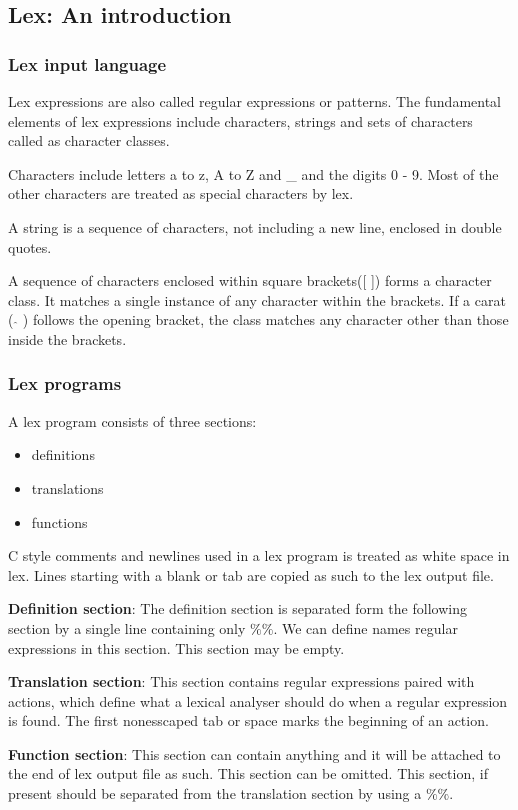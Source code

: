 \documentclass[a4paper, 12pt]{report}
\begin{document}
\subsection{Lex: An introduction}
\subsubsection{Lex input language}
Lex expressions are also called regular expressions or patterns. The fundamental 
elements of lex expressions include characters, strings and sets of characters
called as character classes.

Characters include letters a to z, A to Z and \_ and the digits 0 - 9. Most of 
the other characters are treated as special characters by lex. 

A string is a sequence of characters, not including a new line, enclosed in 
double quotes.

A sequence of characters enclosed within square brackets([ ]) forms a character 
class. It matches a single instance of any character within the brackets. If a 
carat ( $\hat{}$ ) follows the opening bracket, the class matches any character 
other than those inside the brackets. 

\subsubsection{Lex programs}
A lex program consists of three sections: 
\begin{itemize}
    \item{definitions}
    \item{translations}
    \item{functions}
\end{itemize}

C style comments and newlines used in a lex program is treated as white space in 
lex. Lines starting with a blank or tab are copied as such to the lex output 
file. 

\textbf{Definition section}: The definition section is separated form the following section by 
a single line containing only $\%\%$. We can define names regular expressions 
in this section. This section may be empty.

\textbf{Translation section}: This section contains regular expressions paired with 
actions, which define what a lexical analyser should do when a regular 
expression is found. The first nonesscaped tab or space marks the beginning of
an action.

\textbf{Function section}: This section can contain anything and it will be attached to 
the end of lex output file as such. This section can be omitted. This section, 
if present should be separated from the translation section by using a $\%\%$.
\end{document}

